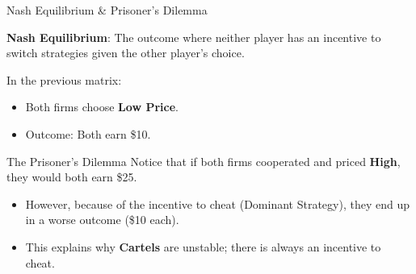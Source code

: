 \documentclass[aspectratio=169]{beamer}
\begin{document}
\begin{frame}{Nash Equilibrium \& Prisoner's Dilemma}
    \begin{center}
    \textbf{Nash Equilibrium}: The outcome where neither player has an incentive to switch strategies given the other player's choice.
    \end{center}

    In the previous matrix:
    \begin{itemize}
        \item Both firms choose \textbf{Low Price}.
        \item Outcome: Both earn \$10.
    \end{itemize}
    
    \begin{alertblock}{The Prisoner's Dilemma}
        Notice that if both firms cooperated and priced \textbf{High}, they would both earn \$25.
        \begin{itemize}
            \item However, because of the incentive to cheat (Dominant Strategy), they end up in a worse outcome (\$10 each).
            \item This explains why \textbf{Cartels} are unstable; there is always an incentive to cheat.
        \end{itemize}
    \end{alertblock}
\end{frame}
\end{document}
